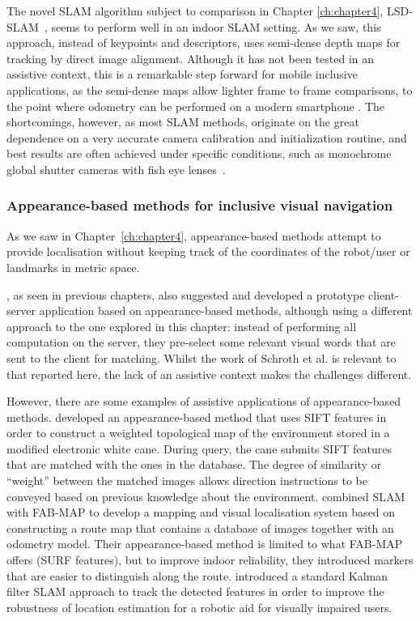The novel SLAM algorithm subject to comparison in Chapter \ref{ch:chapter4}, LSD-SLAM~\citep{engel14eccv}, seems to perform well in an indoor SLAM setting. As we saw, this approach, instead of keypoints and descriptors, uses semi-dense depth maps for tracking by direct image alignment. Although it has not been tested in an assistive context, this is a remarkable step forward for mobile inclusive applications, as the semi-dense maps allow lighter frame to frame comparisons, to the point where odometry can be performed on a modern smartphone \citep{schoeps14ismar}. The shortcomings, however, as most SLAM methods, originate on the great dependence on a very accurate camera calibration and initialization routine, and best results are often achieved under specific conditions, such as monochrome global shutter cameras with fish eye lenses~\citep{engel14eccv}.

\subsubsection{Appearance-based methods for inclusive visual navigation}

As we saw in Chapter~\ref{ch:chapter4}, appearance-based methods attempt to provide localisation without keeping track of the coordinates of the robot/user or landmarks in metric space. 

\citet{schroth2011mobile}, as seen in previous chapters, also suggested and developed a prototype client-server application based on appearance-based methods, although using a different approach to the one explored in this chapter: instead of performing all computation on the server, they pre-select some relevant visual words that are sent to the client for matching. Whilst the work of Schroth et al. is relevant to that reported here, the lack of an assistive context makes the challenges different.

However, there are some examples of assistive applications of appearance-based methods. \citet{ali2010indoor} developed an appearance-based method that uses SIFT features in order to construct a weighted topological map of the environment stored in a modified electronic white cane. During query, the cane submits SIFT features that are matched with the ones in the database. The degree of similarity or ``weight'' between the matched images allows direction instructions to be conveyed based on previous knowledge about the environment. \citet{nguyen2014mapping} combined SLAM with FAB-MAP to develop a mapping and visual localisation system based on constructing a route map that contains a database of images together with an odometry model. Their appearance-based method is limited to what FAB-MAP offers (SURF features), but to improve indoor reliability, they introduced markers that are easier to distinguish along the route. \citet{nguyen2014visual} introduced a standard Kalman filter SLAM approach to track the detected features in order to improve the robustness of location estimation for a robotic aid for visually impaired users.


